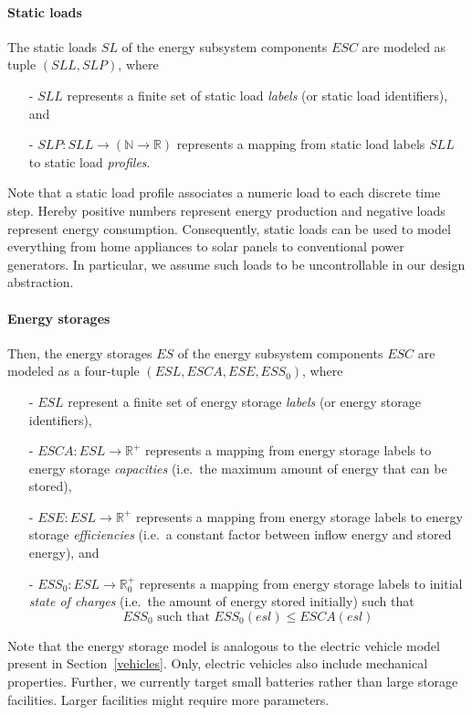 \paragraph{Static loads}
\label{static_loads}

The static loads $SL$ of the energy subsystem components $ESC$ are modeled as tuple $(SLL, SLP)$, where
\begin{itemize}
	\item[-] $SLL$ represents a finite set of static load \textit{labels} (or static load identifiers), and
	\item[-] $SLP: SLL \rightarrow (\mathbb{N} \rightarrow \mathbb{R})$ represents a mapping from static load labels $SLL$ to static load \textit{profiles}.
\end{itemize}
Note that a static load profile associates a numeric load to each discrete time step. Hereby positive numbers represent energy production and negative loads represent energy consumption. Consequently, static loads can be used to model everything from home appliances to solar panels to conventional power generators. In particular, we assume such loads to be uncontrollable in our design abstraction.

\paragraph{Energy storages}
\label{energy_storages}

Then, the energy storages $ES$ of the energy subsystem components $ESC$ are modeled as a four-tuple $(ESL, ESCA, ESE, ESS_0)$, where
\begin{itemize}
	\item[-] $ESL$ represent a finite set of energy storage \textit{labels} (or energy storage identifiers),
	\item[-] $ESCA: ESL \rightarrow \mathbb{R}^+$ represents a mapping from energy storage labels to energy storage \textit{capacities} (i.e.\ the maximum amount of energy that can be stored),
	\item[-] $ESE: ESL \rightarrow \mathbb{R}^+$ represents a mapping from energy storage labels to energy storage \textit{efficiencies} (i.e.\ a constant factor between inflow energy and stored energy), and
	\item[-] $ESS_0: ESL \rightarrow \mathbb{R}_0^+$ represents a mapping from energy storage labels to initial \textit{state of charges} (i.e.\ the amount of energy stored initially) such that
	\[
		ESS_0 \textrm{ such that } ESS_0(esl) \leq ESCA(esl)
	\]
\end{itemize}
Note that the energy storage model is analogous to the electric vehicle model present in Section~\ref{vehicles}. Only, electric vehicles also include mechanical properties. Further, we currently target small batteries rather than large storage facilities. Larger facilities might require more parameters.


